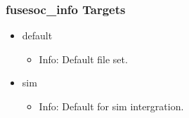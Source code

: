\subsubsection{fusesoc\_info Targets}
\begin{itemize}
\item default
	\begin{itemize}
	\item[$\space$] Info: Default file set.
	\end{itemize}
\item sim
	\begin{itemize}
	\item[$\space$] Info: Default for sim intergration.
	\end{itemize}
\end{itemize}

